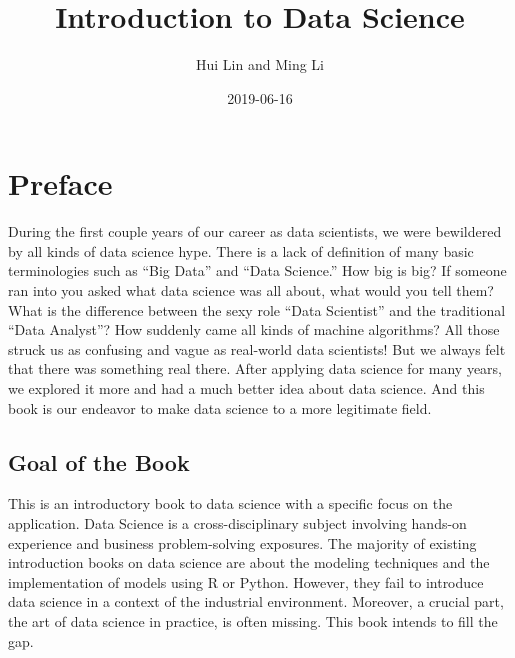 \documentclass[12pt,]{krantz}
\title{Introduction to Data Science}
\author{Hui Lin and Ming Li}
\date{2019-06-16}
\theoremstyle{definition}
\theoremstyle{definition}
\theoremstyle{definition}
\theoremstyle{remark}
\begin{document}
\maketitle

\thispagestyle{empty}
\begin{center}
\end{center}

\setlength{\abovedisplayskip}{-5pt}
\setlength{\abovedisplayshortskip}{-5pt}

{
\hypersetup{linkcolor=black}
\setcounter{tocdepth}{2}
\tableofcontents
}
\listoftables
\listoffigures
\chapter*{Preface}\label{preface}


During the first couple years of our career as data scientists, we were
bewildered by all kinds of data science hype. There is a lack of
definition of many basic terminologies such as ``Big Data'' and ``Data
Science.'' How big is big? If someone ran into you asked what data
science was all about, what would you tell them? What is the difference
between the sexy role ``Data Scientist'' and the traditional ``Data
Analyst''? How suddenly came all kinds of machine algorithms? All those
struck us as confusing and vague as real-world data scientists! But we
always felt that there was something real there. After applying data
science for many years, we explored it more and had a much better idea
about data science. And this book is our endeavor to make data science
to a more legitimate field.

\section*{Goal of the Book}\label{goal-of-the-book}


This is an introductory book to data science with a specific focus on
the application. Data Science is a cross-disciplinary subject involving
hands-on experience and business problem-solving exposures. The majority
of existing introduction books on data science are about the modeling
techniques and the implementation of models using R or Python. However,
they fail to introduce data science in a context of the industrial
environment. Moreover, a crucial part, the art of data science in
practice, is often missing. This book intends to fill the gap.
\end{document}
